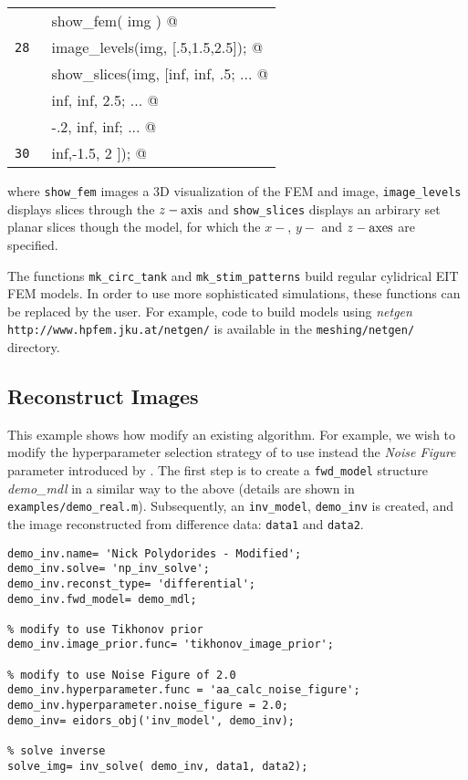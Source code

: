 \documentclass[12pt]{iopart}
\makeatletter
\newcommand{\CN}{\tt\small} %
\newcommand{\CC}{&\verb@}   % start code
\makeatother
\begin{document}
\begin{tabular}{ll}
\CN    \CC show_fem( img ) @\\
\CN 28 \CC image_levels(img, [.5,1.5,2.5]); @\\
\CN    \CC show_slices(img, [inf, inf, .5; ... @\\
\CN    \CC                   inf, inf, 2.5; ... @\\
\CN    \CC                   -.2, inf, inf; ... @\\
\CN 30 \CC                   inf,-1.5,   2 ]); @\\
\end{tabular}

where {\tt show\_fem} images a 3D visualization of the
FEM and image, {\tt image\_levels} displays slices through
the $z-\rm axis$ and {\tt show\_slices} displays an
arbirary set planar slices though the model, for which the
$x-$, $y-$ and $z-\rm axes$ are specified.




The functions {\tt mk\_circ\_tank} and {\tt mk\_stim\_patterns}
build regular cylidrical EIT FEM models. In order to use more
sophisticated simulations, these functions can be replaced
by the user. For example, code to build models using {\em netgen}
{\tt http://www.hpfem.jku.at/netgen/} is available in the
{\tt meshing/netgen/} directory.

\subsection{  Reconstruct Images }

This example shows how modify an existing algorithm.
For example, we wish to modify the
hyperparameter selection strategy of \cite{Polydorides_2002} to use
instead the {\em Noise Figure} parameter introduced by
\cite{Adler_and_Guardo_1996}. The first step is to create a
{\tt fwd\_model} structure {\em demo\_mdl} in a similar
way to the above (details are shown in {\tt examples/demo\_real.m}).
Subsequently, an {\tt inv\_model}, {\tt demo\_inv} is created,
and the image reconstructed from difference data: 
{\tt data1} and {\tt data2}.

\begin{verbatim}
demo_inv.name= 'Nick Polydorides - Modified';
demo_inv.solve= 'np_inv_solve';
demo_inv.reconst_type= 'differential';
demo_inv.fwd_model= demo_mdl;

% modify to use Tikhonov prior
demo_inv.image_prior.func= 'tikhonov_image_prior';

% modify to use Noise Figure of 2.0
demo_inv.hyperparameter.func = 'aa_calc_noise_figure';
demo_inv.hyperparameter.noise_figure = 2.0;
demo_inv= eidors_obj('inv_model', demo_inv);

% solve inverse
solve_img= inv_solve( demo_inv, data1, data2);
\end{verbatim}
\end{document}
